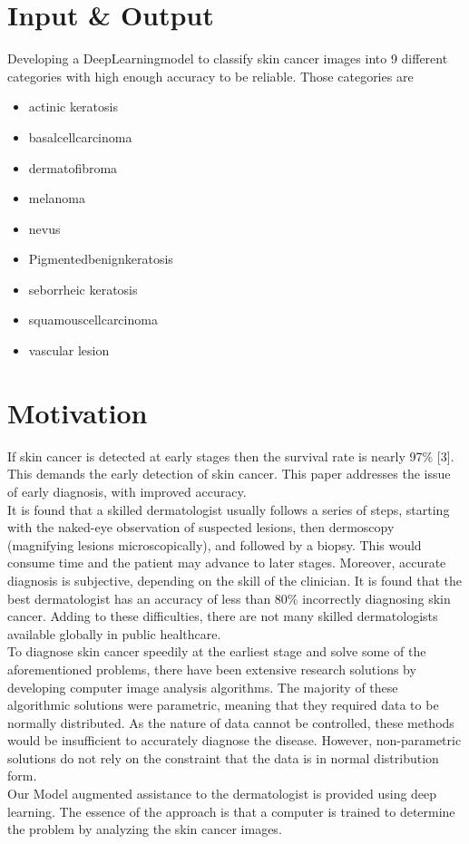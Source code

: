 \documentclass{article}
\begin{document}
	\section*{Input \& Output}
	Developing a DeepLearningmodel to classify skin cancer images
	into 9 different categories with high enough accuracy to be
	reliable. Those categories are
	\begin{itemize}
		
	\item actinic keratosis 
	\item basalcellcarcinoma 
	\item dermatofibroma 
	\item melanoma 
	\item nevus 
	\item Pigmentedbenignkeratosis
	\item seborrheic keratosis 
	\item squamouscellcarcinoma 
	\item vascular lesion
	\end{itemize}
	
	\section*{Motivation}
	If skin cancer is detected at early stages then the survival rate is nearly 97\% [3]. This demands the early detection of skin cancer. This paper addresses the issue of early diagnosis, with improved accuracy.
	\\
	It is found that a skilled dermatologist usually follows a series of steps, starting with the naked-eye observation of suspected lesions, then dermoscopy (magnifying lesions microscopically), and followed by a biopsy. This would consume time and the patient may advance to later stages. Moreover, accurate diagnosis is subjective, depending on the skill of the clinician. It is found that the best dermatologist has an accuracy of less than 80\% incorrectly diagnosing skin cancer. Adding to these difficulties, there are not many skilled dermatologists available globally in public healthcare.
	\\
	
	To diagnose skin cancer speedily at the earliest stage and solve some of the aforementioned problems, there have been extensive research solutions by developing computer image analysis algorithms. The majority of these algorithmic solutions were parametric, meaning that they required data to be normally distributed. As the nature of data cannot be controlled, these methods would be insufficient to accurately diagnose the disease. However, non-parametric solutions do not rely on the constraint that the data is in normal distribution form.
	\\
	Our Model augmented assistance to the dermatologist is provided using deep learning. The essence of the approach is that a computer is trained 
	to determine the problem by analyzing the skin cancer images.\\
	
\end{document}
